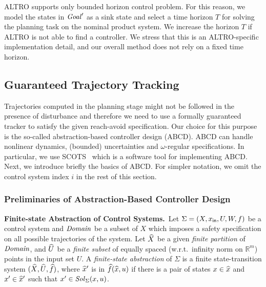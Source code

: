 \begin{remark}
	ALTRO supports only bounded horizon control problem.
	For this reason, we model the states in $\mathit{Goal}'$ as a sink state and select a time horizon $T$ for solving the planning task on the nominal product system. We increase the horizon $T$ if ALTRO is not able to find a controller.
	We stress that this is an ALTRO-specific implementation detail, and our overall method does not rely on a fixed time horizon.
\end{remark}



\subsection{Guaranteed Trajectory Tracking} 

Trajectories computed in the planning stage might not be followed in the presence of disturbance and therefore we need to use a formally guaranteed tracker to satisfy the given reach-avoid specification. Our choice for this purpose is the so-called abstraction-based controller design (ABCD). ABCD can handle nonlinear dynamics, (bounded) uncertainties and $\omega$-regular specifications. In particular, we use SCOTS~\cite{Rungger2016scots} which is a software tool for implementing ABCD. Next, we introduce briefly the basics of ABCD.
For simpler notation, we omit the control system index $i$ in the rest of this section.

\subsubsection{Preliminaries of Abstraction-Based Controller Design}\hfill

\smallskip
\noindent\textbf{Finite-state Abstraction of Control Systems.}\
Let $\Sigma = (X,x_{\mathsf{in}}, U, W, f)$ be a control system and $\mathit{Domain}$ be a subset of $X$ which imposes a safety specification on all possible trajectories of the system. Let $\widehat{X}$ be a given \emph{finite partition} of $\mathit{Domain}$, and $\widehat{U}$ be a \emph{finite subset} of equally spaced (w.r.t.\ infinity norm on $\mathbb{R}^m$) points in the input set $U$.
A \emph{finite-state abstraction} of $\Sigma$ is a finite state-transition system $(\widehat{X},\widehat{U},\widehat{f})$, where $\widehat{x}'$ is in $\widehat{f}(\widehat{x},u)$ if there is a pair of states $x\in \widehat{x}$ and $x'\in \widehat{x}'$ such that $x'\in \mathit{Sol}_\Sigma(x,u)$.

